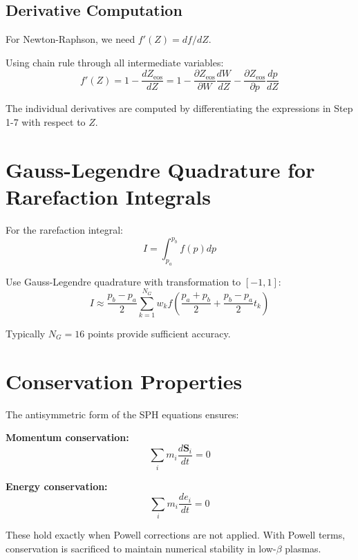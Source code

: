 \documentclass[12pt,a4paper]{article}
\begin{document}
\subsection{Derivative Computation}

For Newton-Raphson, we need $f'(Z) = df/dZ$.

Using chain rule through all intermediate variables:
\begin{equation}
f'(Z) = 1 - \frac{dZ_\text{eos}}{dZ} = 1 - \frac{\partial Z_\text{eos}}{\partial W}\frac{dW}{dZ}
- \frac{\partial Z_\text{eos}}{\partial p}\frac{dp}{dZ}
\end{equation}

The individual derivatives are computed by differentiating the expressions in
Step 1-7 with respect to $Z$.

\section{Gauss-Legendre Quadrature for Rarefaction Integrals}
\label{app:quadrature}

For the rarefaction integral:
\begin{equation}
I = \int_{p_a}^{p_b} f(p) dp
\end{equation}

Use Gauss-Legendre quadrature with transformation to $[-1, 1]$:
\begin{equation}
I \approx \frac{p_b - p_a}{2} \sum_{k=1}^{N_G} w_k f\left(\frac{p_a + p_b}{2} + \frac{p_b - p_a}{2} t_k\right)
\end{equation}

Typically $N_G = 16$ points provide sufficient accuracy.

\section{Conservation Properties}
\label{app:conservation}

The antisymmetric form of the SPH equations ensures:

\textbf{Momentum conservation:}
\begin{equation}
\sum_i m_i \frac{d\bm{S}_i}{dt} = 0
\end{equation}

\textbf{Energy conservation:}
\begin{equation}
\sum_i m_i \frac{de_i}{dt} = 0
\end{equation}

These hold exactly when Powell corrections are not applied. With Powell terms,
conservation is sacrificed to maintain numerical stability in low-$\beta$ plasmas.
\end{document}
